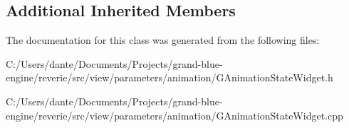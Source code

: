 \subsection*{Additional Inherited Members}


The documentation for this class was generated from the following files\+:\begin{DoxyCompactItemize}
\item 
C\+:/\+Users/dante/\+Documents/\+Projects/grand-\/blue-\/engine/reverie/src/view/parameters/animation/G\+Animation\+State\+Widget.\+h\item 
C\+:/\+Users/dante/\+Documents/\+Projects/grand-\/blue-\/engine/reverie/src/view/parameters/animation/G\+Animation\+State\+Widget.\+cpp\end{DoxyCompactItemize}
